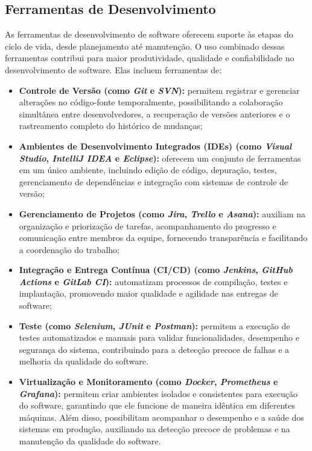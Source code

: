 \subsection{Ferramentas de Desenvolvimento}

As ferramentas de desenvolvimento de software oferecem suporte às etapas do ciclo de vida, desde planejamento até manutenção. O uso combinado dessas ferramentas contribui para maior produtividade, qualidade e confiabilidade no desenvolvimento de software. Elas incluem ferramentas de:

\begin{itemize}
    \item \textbf{Controle de Versão (como \emph{Git} e \emph{SVN}):} permitem registrar e gerenciar alterações no código-fonte temporalmente, possibilitando a colaboração simultânea entre desenvolvedores, a recuperação de versões anteriores e o rastreamento completo do histórico de mudanças;

    \item \textbf{Ambientes de Desenvolvimento Integrados (IDEs) (como \emph{Visual Studio}, \emph{IntelliJ IDEA} e \emph{Eclipse}):} oferecem um conjunto de ferramentas em um único ambiente, incluindo edição de código, depuração, testes, gerenciamento de dependências e integração com sistemas de controle de versão;

    \item \textbf{Gerenciamento de Projetos (como \emph{Jira}, \emph{Trello} e \emph{Asana}):} auxiliam na organização e priorização de tarefas, acompanhamento do progresso e comunicação entre membros da equipe, fornecendo transparência e facilitando a coordenação do trabalho;

    \item \textbf{Integração e Entrega Contínua (CI/CD) (como \emph{Jenkins}, \emph{GitHub Actions} e \emph{GitLab CI}):} automatizam processos de compilação, testes e implantação, promovendo maior qualidade e agilidade nas entregas de software;

    \item \textbf{Teste (como \emph{Selenium}, \emph{JUnit} e \emph{Postman}):} permitem a execução de testes automatizados e manuais para validar funcionalidades, desempenho e segurança do sistema, contribuindo para a detecção precoce de falhas e a melhoria da qualidade do software.

    \item \textbf{Virtualização e Monitoramento (como \emph{Docker}, \emph{Prometheus} e \emph{Grafana}):} permitem criar ambientes isolados e consistentes para execução do software, garantindo que ele funcione de maneira idêntica em diferentes máquinas. Além disso, possibilitam acompanhar o desempenho e a saúde dos sistemas em produção, auxiliando na detecção precoce de problemas e na manutenção da qualidade do software.
\end{itemize}

